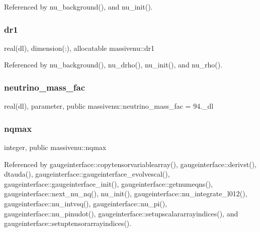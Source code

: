 Referenced by nu\+\_\+background(), and nu\+\_\+init().

\mbox{\label{namespacemassivenu_a73078a1de4febfc2142d1518a0045e06}} 
\subsubsection{\texorpdfstring{dr1}{dr1}}
{\footnotesize\ttfamily real(dl), dimension(\+:), allocatable massivenu\+::dr1\hspace{0.3cm}{\ttfamily [private]}}



Referenced by nu\+\_\+background(), nu\+\_\+drho(), nu\+\_\+init(), and nu\+\_\+rho().

\mbox{\label{namespacemassivenu_a12e889efae466257e45a8341a9f6150e}} 
\subsubsection{\texorpdfstring{neutrino\+\_\+mass\+\_\+fac}{neutrino\_mass\_fac}}
{\footnotesize\ttfamily real(dl), parameter, public massivenu\+::neutrino\+\_\+mass\+\_\+fac = 94.\+\_\+dl}

\mbox{\label{namespacemassivenu_a95412d3036cd184190c2157292ec7732}} 
\subsubsection{\texorpdfstring{nqmax}{nqmax}}
{\footnotesize\ttfamily integer, public massivenu\+::nqmax}



Referenced by gaugeinterface\+::copytensorvariablearray(), gaugeinterface\+::derivst(), dtauda(), gaugeinterface\+::gaugeinterface\+\_\+evolvescal(), gaugeinterface\+::gaugeinterface\+\_\+init(), gaugeinterface\+::getnumeqns(), gaugeinterface\+::next\+\_\+nu\+\_\+nq(), nu\+\_\+init(), gaugeinterface\+::nu\+\_\+integrate\+\_\+l012(), gaugeinterface\+::nu\+\_\+intvsq(), gaugeinterface\+::nu\+\_\+pi(), gaugeinterface\+::nu\+\_\+pinudot(), gaugeinterface\+::setupscalararrayindices(), and gaugeinterface\+::setuptensorarrayindices().

